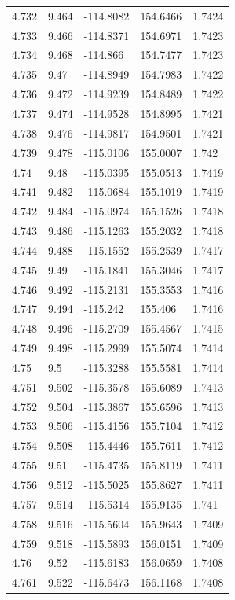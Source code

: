 \begin{tabular}{lllll}
4.732 & 9.464 & -114.8082 & 154.6466 & 1.7424 \\
4.733 & 9.466 & -114.8371 & 154.6971 & 1.7423 \\
4.734 & 9.468 & -114.866 & 154.7477 & 1.7423 \\
4.735 & 9.47 & -114.8949 & 154.7983 & 1.7422 \\
4.736 & 9.472 & -114.9239 & 154.8489 & 1.7422 \\
4.737 & 9.474 & -114.9528 & 154.8995 & 1.7421 \\
4.738 & 9.476 & -114.9817 & 154.9501 & 1.7421 \\
4.739 & 9.478 & -115.0106 & 155.0007 & 1.742 \\
4.74 & 9.48 & -115.0395 & 155.0513 & 1.7419 \\
4.741 & 9.482 & -115.0684 & 155.1019 & 1.7419 \\
4.742 & 9.484 & -115.0974 & 155.1526 & 1.7418 \\
4.743 & 9.486 & -115.1263 & 155.2032 & 1.7418 \\
4.744 & 9.488 & -115.1552 & 155.2539 & 1.7417 \\
4.745 & 9.49 & -115.1841 & 155.3046 & 1.7417 \\
4.746 & 9.492 & -115.2131 & 155.3553 & 1.7416 \\
4.747 & 9.494 & -115.242 & 155.406 & 1.7416 \\
4.748 & 9.496 & -115.2709 & 155.4567 & 1.7415 \\
4.749 & 9.498 & -115.2999 & 155.5074 & 1.7414 \\
4.75 & 9.5 & -115.3288 & 155.5581 & 1.7414 \\
4.751 & 9.502 & -115.3578 & 155.6089 & 1.7413 \\
4.752 & 9.504 & -115.3867 & 155.6596 & 1.7413 \\
4.753 & 9.506 & -115.4156 & 155.7104 & 1.7412 \\
4.754 & 9.508 & -115.4446 & 155.7611 & 1.7412 \\
4.755 & 9.51 & -115.4735 & 155.8119 & 1.7411 \\
4.756 & 9.512 & -115.5025 & 155.8627 & 1.7411 \\
4.757 & 9.514 & -115.5314 & 155.9135 & 1.741 \\
4.758 & 9.516 & -115.5604 & 155.9643 & 1.7409 \\
4.759 & 9.518 & -115.5893 & 156.0151 & 1.7409 \\
4.76 & 9.52 & -115.6183 & 156.0659 & 1.7408 \\
4.761 & 9.522 & -115.6473 & 156.1168 & 1.7408 \\

\end{tabular}
